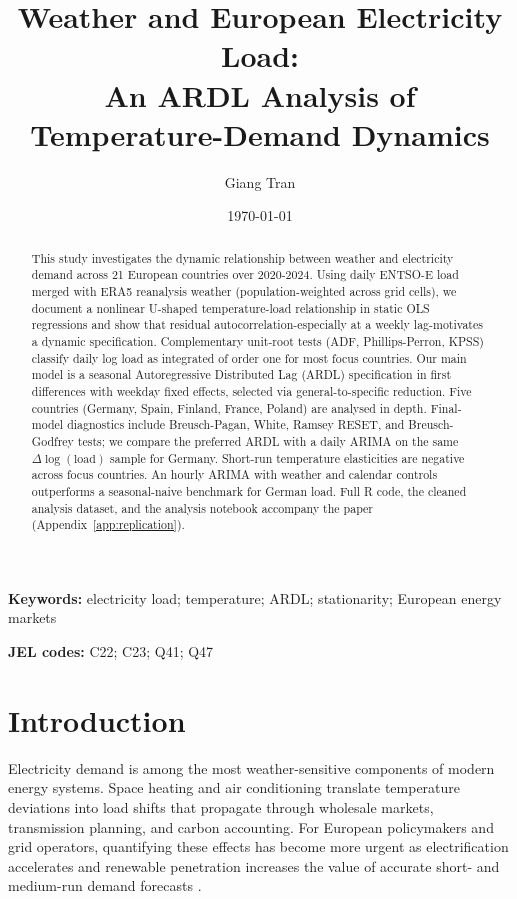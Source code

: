 \documentclass[12pt,a4paper]{article}
\title{Weather and European Electricity Load:\\An ARDL Analysis of Temperature-Demand Dynamics}
\author{Giang Tran}
\date{\today}
\begin{document}
\maketitle

\begin{abstract}
This study investigates the dynamic relationship between weather and electricity demand across 21 European countries over 2020-2024. Using daily ENTSO-E load merged with ERA5 reanalysis weather (population-weighted across grid cells), we document a nonlinear U-shaped temperature-load relationship in static OLS regressions and show that residual autocorrelation-especially at a weekly lag-motivates a dynamic specification. Complementary unit-root tests (ADF, Phillips-Perron, KPSS) classify daily log load as integrated of order one for most focus countries. Our main model is a seasonal Autoregressive Distributed Lag (ARDL) specification in first differences with weekday fixed effects, selected via general-to-specific reduction. Five countries (Germany, Spain, Finland, France, Poland) are analysed in depth. Final-model diagnostics include Breusch-Pagan, White, Ramsey RESET, and Breusch-Godfrey tests; we compare the preferred ARDL with a daily ARIMA on the same $\Delta\log(\text{load})$ sample for Germany. Short-run temperature elasticities are negative across focus countries. An hourly ARIMA with weather and calendar controls outperforms a seasonal-naive benchmark for German load. Full R code, the cleaned analysis dataset, and the analysis notebook accompany the paper (Appendix~\ref{app:replication}).
\end{abstract}

\noindent\textbf{Keywords:} electricity load; temperature; ARDL; stationarity; European energy markets

\noindent\textbf{JEL codes:} C22; C23; Q41; Q47

\section{Introduction}
\label{sec:intro}

Electricity demand is among the most weather-sensitive components of modern energy systems. Space heating and air conditioning translate temperature deviations into load shifts that propagate through wholesale markets, transmission planning, and carbon accounting. For European policymakers and grid operators, quantifying these effects has become more urgent as electrification accelerates and renewable penetration increases the value of accurate short- and medium-run demand forecasts \citep{weron2014}.
\end{document}
